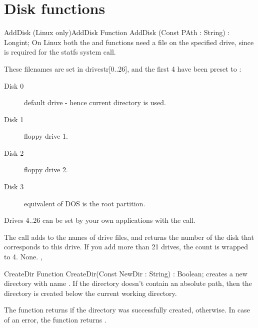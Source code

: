 


\section{Disk functions}

\begin{functionl}{AddDisk (Linux only)}{AddDisk}
\Declaration
Function AddDisk (Const PAth : String) : Longint;
\Description
On Linux  both the  and  functions need a
file on the specified drive, since is required for the statfs system call.

These filenames are set in drivestr[0..26], and the first 4 have been
preset to :
\begin{description}
\item[Disk 0]   default drive - hence current directory is used.
\item[Disk 1]   floppy drive 1.
\item[Disk 2]   floppy drive 2.
\item[Disk 3]    equivalent of DOS is the root partition.
\end{description}
Drives 4..26 can be set by your own applications with the  call.

The  call adds  to the names of drive files, and
returns the number of the disk that corresponds to this drive. If you
add more than 21 drives, the count is wrapped to 4.
\Errors
None.
\SeeAlso
{}, 
\end{functionl}

\begin{function}{CreateDir}
\Declaration
Function CreateDir(Const NewDir : String) : Boolean;
\Description
{} creates a new directory with name .
If the directory doesn't contain an absolute path, then the directory is
created below the current working directory.

The function returns  if the directory was successfully
created,  otherwise.
\Errors
In case of an error, the function returns .
\SeeAlso
{}
\end{function}



